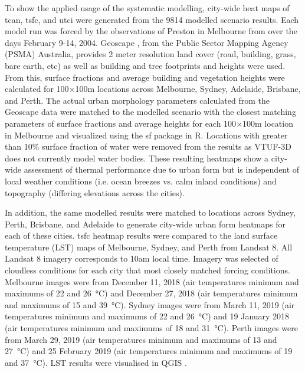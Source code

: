 \documentclass[final,3p,times,authoryear]{elsarticle}
\begin{document}
To show the applied usage of the systematic modelling, city-wide heat maps of \gls{tcan}, \gls{tsfc}, and \gls{utci} were generated from the 9814 modelled scenario results. Each model run was forced by the observations of Preston in Melbourne from \cite{Coutts2007} over the days February 9-14, 2004. Geoscape \citep{Geoscape2020}, from the Public Sector Mapping Agency (PSMA) Australia, provides 2 meter resolution land cover (road, building, grass, bare earth, etc) as well as building and tree footprints and heights were used. From this, surface fractions and average building and vegetation heights were calculated for 100$\times$100m locations across Melbourne, Sydney, Adelaide, Brisbane, and Perth. The actual urban morphology parameters calculated from the Geoscape data were matched to the modelled scenario with the closest matching parameters of surface fractions and average heights for each 100$\times$100m location in Melbourne and visualized using the sf package \citep{Pebesma2018} in R. Locations with greater than 10\% surface fraction of water were removed from the results as VTUF-3D does not currently model water bodies. These resulting heatmaps show a city-wide assessment of thermal performance due to urban form but is independent of local weather conditions (i.e. ocean breezes vs. calm inland conditions) and topography (differing elevations across the cities). 

In addition, the same modelled results were matched to locations across Sydney, Perth, Brisbane, and Adelaide to generate city-wide urban form heatmaps for each of these cities. \gls{tsfc} heatmap results were compared to the land surface temperature (LST) maps of Melbourne, Sydney, and Perth from Landsat 8. All Landsat 8 imagery corresponds to 10am local time. Imagery was selected of cloudless conditions for each city that most closely matched forcing conditions. Melbourne images were from December 11, 2018  (air temperatures minimum and maximums of 22 and 26\SI{}{\degreeCelsius}) and December 27, 2018  (air temperatures minimum and maximums of 15 and 39\SI{}{\degreeCelsius}). Sydney images were from March 11, 2019  (air temperatures minimum and maximums of 22 and 26\SI{}{\degreeCelsius}) and 19 January 2018  (air temperatures minimum and maximums of 18 and 31\SI{}{\degreeCelsius}). Perth images were from March 29, 2019  (air temperatures minimum and maximums of 13 and 27\SI{}{\degreeCelsius}) and 25 February 2019  (air temperatures minimum and maximums of 19 and 37\SI{}{\degreeCelsius}). LST results were visualised in QGIS \citep{QGIS2009}.
\end{document}
